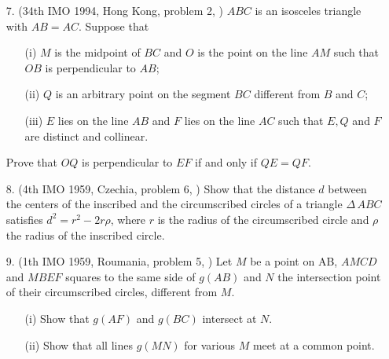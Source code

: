 \documentclass{article}
\begin{document}
\begin{itemize}
\item[7.] (34th IMO 1994, Hong Kong, problem 2, \cite{IMO}) $ABC$ is
an isosceles triangle with $AB = AC$. Suppose that
\begin{enumerate}
\item[(i)] $M$ is the midpoint of $BC$ and $O$ is the point on the
line $AM$ such that $OB$ is perpendicular to $AB$;
\item[(ii)] $Q$ is an arbitrary point on the segment $BC$ different
from $B$ and $C$;
\item[(iii)] $E$ lies on the line $AB$ and $F$ lies on the line $AC$
such that $E, Q$ and $F$ are distinct and collinear.
\end{enumerate}
\noindent
Prove that $OQ$ is perpendicular to $EF$ if and only if $QE = QF$.

\item[8.] (4th IMO 1959, Czechia, problem 6, \cite{Morozova:68}) Show
that the distance $d$ between the centers of the inscribed and the
circumscribed circles of a triangle $\Delta\,ABC$ satisfies
$d^2=r^2-2r\rho$, where $r$ is the radius of the circumscribed circle
and $\rho$ the radius of the inscribed circle.

\item[9.] (1th IMO 1959, Roumania, problem 5, \cite{Morozova:68}) Let
$M$ be a point on AB, $AMCD$ and $MBEF$ squares to the same side of
$g(AB)$ and $N$ the intersection point of their circumscribed circles,
different from $M$.
\begin{enumerate}
\item[(i)] Show that $g(AF)$ and $g(BC)$ intersect at $N$.
\item[(ii)] Show that all lines $g(MN)$ for various $M$ meet at a
common point. 
\end{enumerate}

\end{itemize}


 
\end{document}
